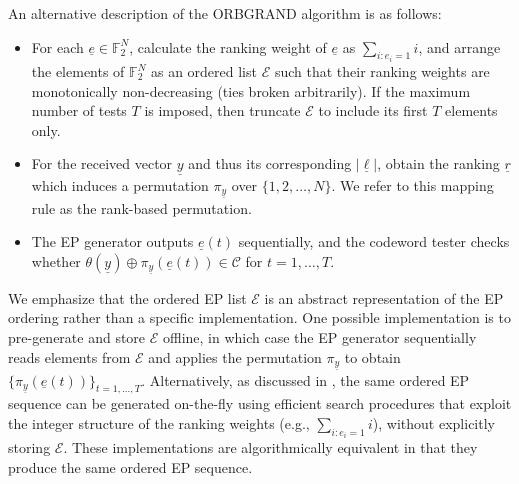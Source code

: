 \documentclass[letterpaper,draftclsnofoot,onecolumn]{IEEEtran}
\begin{document}
An alternative description of the ORBGRAND algorithm is as follows:
\begin{itemize}
    \item For each $\underline{e} \in \mathbb{F}_2^N$, calculate the ranking weight of $\underline{e}$ as $\sum_{i:e_i=1} i$, and arrange the elements of $\mathbb{F}_2^N$ as an ordered list $\mathcal{E}$ such that their ranking weights are monotonically non-decreasing (ties broken arbitrarily). If the maximum number of tests $T$ is imposed, then truncate $\mathcal{E}$ to include its first $T$ elements only.%
    \item For the received vector $\underline{y}$ and thus its corresponding $|\underline{\ell}|$, obtain the ranking $\underline{r}$ which induces a permutation $\pi_{\underline{y}}$ over $\{1, 2, \ldots, N\}$. We refer to this mapping rule as the rank-based permutation.
    \item The EP generator outputs $\underline{e}(t)$ sequentially, and the codeword tester checks whether $\theta(\underline{y}) \oplus \pi_{\underline{y}}(\underline{e}(t)) \in \mathcal{C}$ for $t=1,\ldots,T$.
\end{itemize}

We emphasize that the ordered EP list $\mathcal{E}$ is an abstract representation of the EP ordering rather than a specific implementation. One possible implementation is to pre-generate and store $\mathcal{E}$ offline, in which case the EP generator sequentially reads elements from $\mathcal{E}$ and applies the permutation $\pi_{\underline{y}}$ to obtain $\{\pi_{\underline{y}}(\underline{e}(t))\}_{t=1,\ldots,T}$. Alternatively, as discussed in \cite{duffy2022ORBGRAND}, the same ordered EP sequence can be generated on-the-fly using efficient search procedures that exploit the integer structure of the ranking weights (e.g., $\sum_{i:e_i=1} i$), without explicitly storing $\mathcal{E}$. These implementations are algorithmically equivalent in that they produce the same ordered EP sequence.
\end{document}

